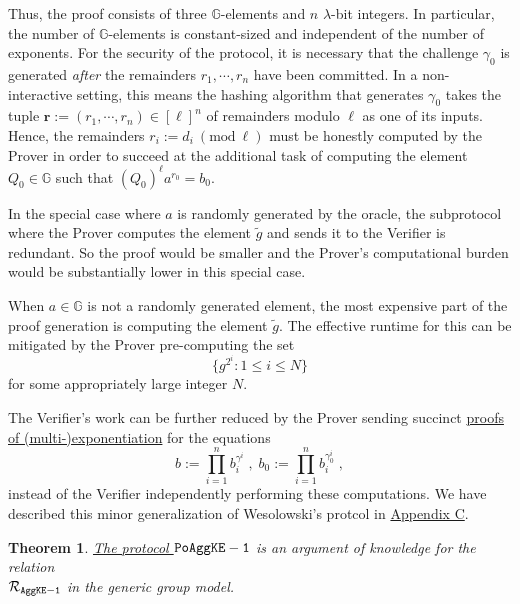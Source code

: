 \documentclass[11pt, lettersize, notitlepage, leqno, footskip=0.6cm]{article}
\newcommand{\pl}{\prod\limits}
\newcommand{\bG}{\mathbb{G}}
\newcommand{\wti}{\widetilde}
\newcommand{\mc}{\mathcal}
\newcommand{\mb}{\mathbb}
\newcommand{\mbf}{\mathbf}
\newcommand{\lam}{\lambda}
\newcommand{\vs}{\vspace{-0.15cm}}
\newcommand{\Mod}[1]{\ (\mathrm{mod}\ #1)}
\newtheorem{Thm}{Theorem}[section]
\numberwithin{equation}{section}
\begin{document}
Thus, the proof consists of three $\mb{G}$-elements and $n$ $\lam$-bit integers. In particular, the number of $\mb{G}$-elements is constant-sized and independent of the number of exponents. For the security of the protocol, it is necessary that the challenge $\gamma_{0}$ is generated \textit{after} the remainders $r_1,\cdots,r_n$ have been committed. In a non-interactive setting, this means the hashing algorithm that generates $\gamma_{0}$ takes the tuple $\mbf{r}:= (r_1,\cdots,r_n)\in [\ell]^n$ of remainders modulo $\ell$ as one of its inputs. Hence, the remainders $r_i:= d_i\Mod{\ell}$ must be honestly computed by the Prover in order to succeed at the additional task of computing the element $Q_0\in\mb{G}$ such that $(Q_0)^{\ell}a^{r_0} = b_0$.

In the special case where $a$ is randomly generated by the oracle, the subprotocol where the Prover computes the element $\wti{g}$ and sends it to the Verifier is redundant. So the proof would be smaller and the Prover's computational burden would be substantially lower in this special case.

When $a\in\bG$ is not a randomly generated element, the most expensive part of the proof generation is computing the element $\wti{g}$. The effective runtime for this can be mitigated by the Prover pre-computing the set \vs $$\{g^{2^i}: 1\leq i \leq N \}$$ for some appropriately large integer $N$.

The Verifier's work can be further reduced by the Prover sending succinct \hyperlink{PoME}{proofs of (multi-)exponentiation} for the equations \vs $$b := \pl_{i=1}^n b_i^{\gamma^i}\;,\;b_0 := \pl_{i=1}^n b_i^{\gamma_{0}^i}\;,$$ instead of the Verifier independently performing these computations. We have described this minor generalization of Wesolowski's protcol in \hyperlink{PoME}{Appendix C}.


\vspace{0.2cm}

\begin{Thm} \hyperlink{AggKE-1}{The protocol $\tt{PoAggKE-1}$} is an argument of knowledge for the relation\\ $\mc{R}_{{\tt{AggKE-1}}}$ in the generic group model.\end{Thm}
\end{document}
